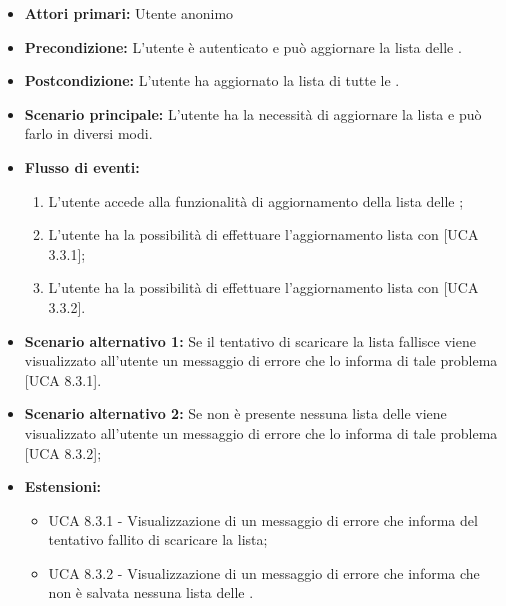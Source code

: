 \begin{itemize} 
	\item \textbf{Attori primari:} Utente anonimo
	\item \textbf{Precondizione:} L'utente è autenticato e può aggiornare la lista delle .
	\item \textbf{Postcondizione:} L'utente ha aggiornato la lista di tutte le .
	\item \textbf{Scenario principale:} L'utente ha la necessità di aggiornare la lista e può farlo in diversi modi.
	\item \textbf{Flusso di eventi:}
	\begin{enumerate}
		\item L'utente accede alla funzionalità di aggiornamento della lista delle ;
		\item L'utente ha la possibilità di effettuare l'aggiornamento lista  con  [UCA 3.3.1];
		\item L'utente ha la possibilità di effettuare l'aggiornamento lista  con  [UCA 3.3.2].
	\end{enumerate}
	\item \textbf{Scenario alternativo 1:} Se il tentativo di scaricare la lista fallisce viene visualizzato all'utente un messaggio di errore che lo informa di tale problema [UCA 8.3.1].
	\item \textbf{Scenario alternativo 2:} Se non è presente nessuna lista delle  viene visualizzato all'utente un messaggio di errore che lo informa di tale problema [UCA 8.3.2];
	\item \textbf{Estensioni:}
	\begin{itemize}
		\item UCA 8.3.1 - Visualizzazione di un messaggio di errore che informa del tentativo fallito di scaricare la lista;
		\item UCA 8.3.2 - Visualizzazione di un messaggio di errore che informa che non è salvata nessuna lista delle .
	\end{itemize}
\end{itemize}

